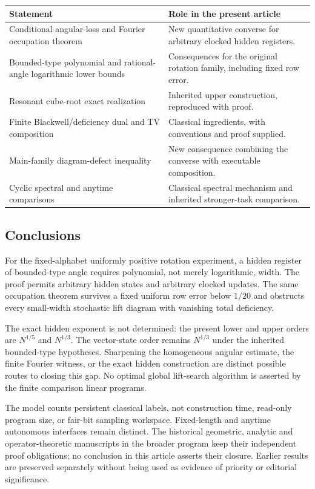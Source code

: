\begin{center}\small
\begin{tabular}{p{}p{}}
\toprule
Statement & Role in the present article \\
\midrule
Conditional angular-loss and Fourier occupation theorem & New quantitative converse for arbitrary clocked hidden registers.\\
Bounded-type polynomial and rational-angle logarithmic lower bounds & Consequences for the original rotation family, including fixed row error.\\
Resonant cube-root exact realization & Inherited upper construction, reproduced with proof.\\
Finite Blackwell/deficiency dual and TV composition & Classical ingredients, with conventions and proof supplied.\\
Main-family diagram-defect inequality & New consequence combining the converse with executable composition.\\
Cyclic spectral and anytime comparisons & Classical spectral mechanism and inherited stronger-task comparison.\\
\bottomrule
\end{tabular}
\end{center}

\subsection{Conclusions}
For the fixed-alphabet uniformly positive rotation experiment, a hidden
register of bounded-type angle requires polynomial, not merely
logarithmic, width. The proof permits arbitrary hidden states and
arbitrary clocked updates. The same occupation theorem survives a fixed
uniform row error below $1/20$ and obstructs every small-width stochastic
lift diagram with vanishing total deficiency.

The exact hidden exponent is not determined: the present lower and upper
orders are $N^{1/5}$ and $N^{1/3}$. The vector-state order remains
$N^{1/3}$ under the inherited bounded-type hypotheses. Sharpening the
homogeneous angular estimate, the finite Fourier witness, or the exact
hidden construction are distinct possible routes to closing this gap.
No optimal global lift-search algorithm is asserted by the finite
comparison linear programs.

The model counts persistent classical labels, not construction time,
read-only program size, or fair-bit sampling workspace. Fixed-length
and anytime autonomous interfaces remain distinct. The historical
geometric, analytic and operator-theoretic manuscripts in the broader
program keep their independent proof obligations; no conclusion in this
article asserts their closure. Earlier results are preserved separately
without being used as evidence of priority or editorial significance.
